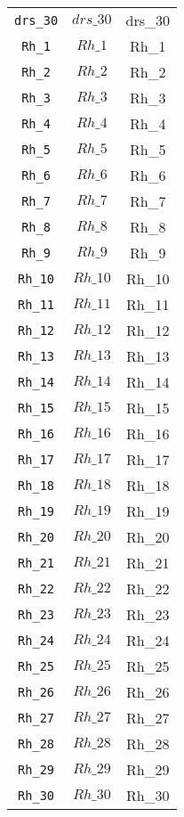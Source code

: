 \begin{center}
\begin{longtable}{ccc}
\texttt{drs\_30} & $drs\_30$ & drs\_30\\
\texttt{Rh\_1} & $Rh\_1$ & Rh\_1\\
\texttt{Rh\_2} & $Rh\_2$ & Rh\_2\\
\texttt{Rh\_3} & $Rh\_3$ & Rh\_3\\
\texttt{Rh\_4} & $Rh\_4$ & Rh\_4\\
\texttt{Rh\_5} & $Rh\_5$ & Rh\_5\\
\texttt{Rh\_6} & $Rh\_6$ & Rh\_6\\
\texttt{Rh\_7} & $Rh\_7$ & Rh\_7\\
\texttt{Rh\_8} & $Rh\_8$ & Rh\_8\\
\texttt{Rh\_9} & $Rh\_9$ & Rh\_9\\
\texttt{Rh\_10} & $Rh\_10$ & Rh\_10\\
\texttt{Rh\_11} & $Rh\_11$ & Rh\_11\\
\texttt{Rh\_12} & $Rh\_12$ & Rh\_12\\
\texttt{Rh\_13} & $Rh\_13$ & Rh\_13\\
\texttt{Rh\_14} & $Rh\_14$ & Rh\_14\\
\texttt{Rh\_15} & $Rh\_15$ & Rh\_15\\
\texttt{Rh\_16} & $Rh\_16$ & Rh\_16\\
\texttt{Rh\_17} & $Rh\_17$ & Rh\_17\\
\texttt{Rh\_18} & $Rh\_18$ & Rh\_18\\
\texttt{Rh\_19} & $Rh\_19$ & Rh\_19\\
\texttt{Rh\_20} & $Rh\_20$ & Rh\_20\\
\texttt{Rh\_21} & $Rh\_21$ & Rh\_21\\
\texttt{Rh\_22} & $Rh\_22$ & Rh\_22\\
\texttt{Rh\_23} & $Rh\_23$ & Rh\_23\\
\texttt{Rh\_24} & $Rh\_24$ & Rh\_24\\
\texttt{Rh\_25} & $Rh\_25$ & Rh\_25\\
\texttt{Rh\_26} & $Rh\_26$ & Rh\_26\\
\texttt{Rh\_27} & $Rh\_27$ & Rh\_27\\
\texttt{Rh\_28} & $Rh\_28$ & Rh\_28\\
\texttt{Rh\_29} & $Rh\_29$ & Rh\_29\\
\texttt{Rh\_30} & $Rh\_30$ & Rh\_30\\
\hline%
\end{longtable}
\end{center}
